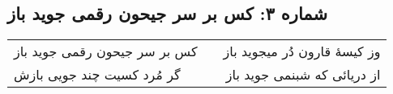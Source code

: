 \begin{center}
\section*{شماره ۳: کس بر سر جیحون رقمی جوید باز}
\label{sec:003}
\begin{longtable}{l p{0.5cm} r}
کس بر سر جیحون رقمی جوید باز
&&
وز کیسهٔ قارون دُر میجوید باز
\\
گر مُرد کسیت چند جویی بازش
&&
از دریائی که شبنمی جوید باز
\\
\end{longtable}
\end{center}
